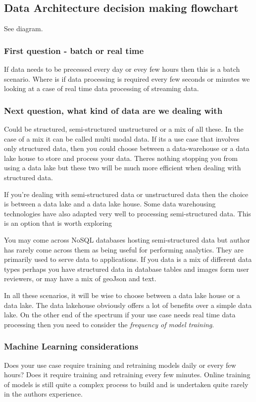 \subsection{Data Architecture decision making flowchart}
See diagram.

\subsubsection{First question - batch or real time}
If data needs to be precessed every day or evey few hours then this is a batch scenario.
Where is if data processing is required every few seconds or minutes we looking at a case of real time data processing of streaming data.

\subsubsection{Next question, what kind of data are we dealing with}
Could be structured, semi-structured unstructured or a mix of all these.
In the case of a mix it can be called multi modal data.
If its a use case that involves only structured data, then you could choose between a data-warehouse or a data lake house to store and process your data.
Theres nothing stopping you from using a data lake but these two will be much more efficient when dealing with structured data.

If you're dealing with semi-structured data or unstructured data then the choice is between a data lake and a data lake house.
Some data warehousing technologies have also adapted very well to processing semi-structured data.
This is an option that is worth exploring

You may come across NoSQL databases hosting semi-structured data but author has rarely come across them as being useful for performing analytics.
They are primarily used to serve data to applications.
If you data is a mix of different data types perhaps you have structured data in database tables and images form user reviewers, or may have a mix of geoJson and text.

In all these scenarios, it will be wise to choose between a data lake house or a data lake.
The data lakehouse obviously offers a lot of benefits over a simple data lake.
On the other end of the spectrum if your use case needs real time data processing then you need to consider the \textit{frequency of model training}.

\subsubsection{Machine Learning considerations}
Does your use case require training and retraining models daily or every few hours?
Does it require training and retraining every few minutes.
Online training of models is still quite a complex process to build and is undertaken quite rarely in the authors experience.

